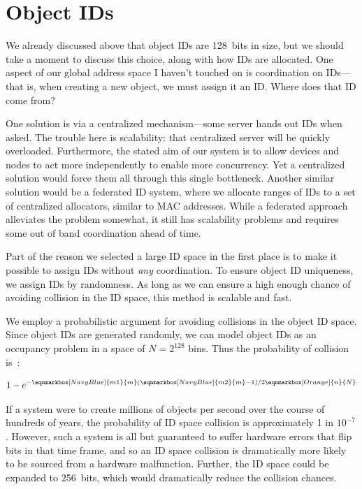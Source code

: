 \section{Object IDs}

We already discussed above that object IDs are 128~bits in size, but we should take a moment to discuss this choice,
along with how IDs are allocated. One aspect of our global address space I haven't touched on is coordination on IDs---that is,
when creating a new object, we must assign it an ID. Where does that ID come from?

One solution is via a centralized mechanism---some server hands out IDs when asked. The trouble here is scalability:
that centralized server will be quickly overloaded. Furthermore, the stated aim of our system is to allow devices and
nodes to act more independently to enable more concurrency. Yet a centralized solution would force them all through this
single bottleneck. Another similar solution would be a federated ID system, where we allocate ranges of IDs to a set of
centralized allocators, similar to MAC addresses. While a federated approach alleviates the problem somewhat, it still
has scalability problems and requires some out of band coordination ahead of time.

Part of the reason we selected a large ID space in the first place is to make it possible to assign IDs without
\emph{any} coordination. To ensure object ID uniqueness, we assign IDs by randomness. As long as we can ensure a high
enough chance of avoiding collision in the ID space, this method is scalable and fast.

We employ a probabilistic argument for avoiding collisions in the
object ID space. Since object IDs are generated randomly, we can model object IDs as an occupancy
problem in a space of $N = 2^{128}$ bins. Thus the probability of collision
is~\cite{motwani95}:

\begin{gather*}
    1 - e^{-
            \eqnmarkbox[NavyBlue]{m1}{m}
            (
            \eqnmarkbox[NavyBlue]{m2}{m}
            -1) / 2
            \eqnmarkbox[Orange]{n}{N}
        }
\end{gather*}

If a system were to create millions of objects per second over the course of hundreds of years, the
probability of ID space collision is approximately 1 in $10^{-7}$. However, such a system is all but
guaranteed to suffer hardware errors that flip bits in that time frame, and so an ID space collision is dramatically more likely to be
sourced from a hardware malfunction. Further, the ID space
could be expanded to 256~bits, which would dramatically reduce the collision chances.

